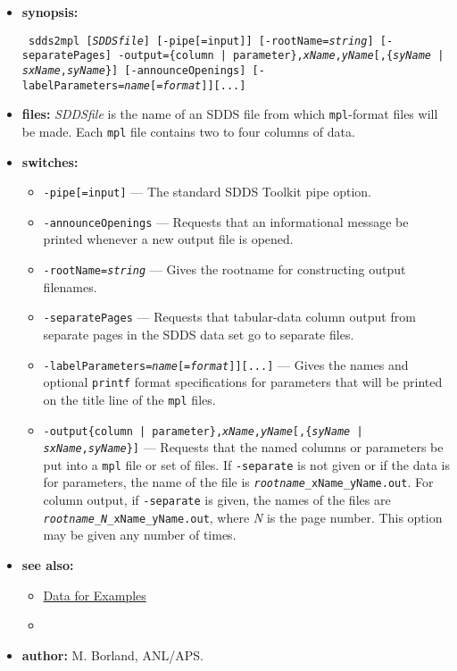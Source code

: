 \begin{itemize}
\item {\bf synopsis:}
\begin{flushleft}{\tt
sdds2mpl [{\em SDDSfile}] [-pipe[=input]] [-rootName={\em string}] [-separatePages] 
-output=\{column | parameter\},{\em xName},{\em yName}[,\{{\em syName} | {\em sxName},{\em syName}\}]
[-announceOpenings] [-labelParameters={\em name}[={\em format}]][...]
}\end{flushleft}
\item {\bf files:}
{\em SDDSfile} is the name of an SDDS file from which {\tt mpl}-format files will be made.  Each 
{\tt mpl} file contains two to four columns of data.
\item {\bf switches:}
   \begin{itemize}
   \item \verb|-pipe[=input]| --- The standard SDDS Toolkit pipe option.
   \item \verb|-announceOpenings| --- Requests that an informational message be printed whenever a new
   output file is opened.
   \item  {\tt -rootName={\em string}} --- Gives the rootname for constructing output filenames.
   \item \verb|-separatePages| --- Requests that tabular-data column output from separate pages in the SDDS
   data set go to separate files.
   \item {\tt -labelParameters={\em name}[={\em format}]][...]} --- 
        Gives the names and optional \verb|printf| format specifications for
   parameters that will be printed on the title line of the \verb|mpl| files.
   \item {\tt -output\{column | parameter\},{\em xName},{\em yName}[,\{{\em syName} | {\em sxName},{\em syName}\}]} 
        --- Requests that the named columns or parameters be put into a \verb|mpl| file or set
        of files.  If \verb|-separate| is not given or if the data is for parameters, the name of the file is 
       {\tt {\em rootname}\_{xName}\_{yName}.out}.  For column output, if \verb|-separate| is given, the names of the
       files are {\tt {\em rootname}\_{\em N}\_{xName}\_{yName}.out}, where {\em N} is the page number.  This 
        option may be given any number of times.
   \end{itemize}

\item {\bf see also:}
    \begin{itemize}
    \item \hyperref[exampleData]{Data for Examples}
    \item {}
    \end{itemize}
\item {\bf author:} M. Borland, ANL/APS.
\end{itemize}

